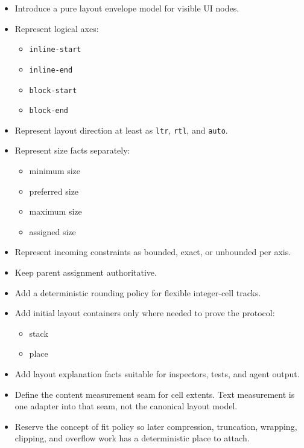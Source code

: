 \begin{itemize}
\tightlist
\item
  Introduce a pure layout envelope model for visible UI nodes.
\item
  Represent logical axes:

  \begin{itemize}
  \tightlist
  \item
    \texttt{i\allowbreak{}n\allowbreak{}l\allowbreak{}i\allowbreak{}n\allowbreak{}e\allowbreak{}-\allowbreak{}s\allowbreak{}t\allowbreak{}a\allowbreak{}r\allowbreak{}t}
  \item
    \texttt{i\allowbreak{}n\allowbreak{}l\allowbreak{}i\allowbreak{}n\allowbreak{}e\allowbreak{}-\allowbreak{}e\allowbreak{}n\allowbreak{}d}
  \item
    \texttt{b\allowbreak{}l\allowbreak{}o\allowbreak{}c\allowbreak{}k\allowbreak{}-\allowbreak{}s\allowbreak{}t\allowbreak{}a\allowbreak{}r\allowbreak{}t}
  \item
    \texttt{b\allowbreak{}l\allowbreak{}o\allowbreak{}c\allowbreak{}k\allowbreak{}-\allowbreak{}e\allowbreak{}n\allowbreak{}d}
  \end{itemize}
\item
  Represent layout direction at least as \texttt{l\allowbreak{}t\allowbreak{}r}, \texttt{r\allowbreak{}t\allowbreak{}l}, and \texttt{a\allowbreak{}u\allowbreak{}t\allowbreak{}o}.
\item
  Represent size facts separately:

  \begin{itemize}
  \tightlist
  \item
    minimum size
  \item
    preferred size
  \item
    maximum size
  \item
    assigned size
  \end{itemize}
\item
  Represent incoming constraints as bounded, exact, or unbounded per axis.
\item
  Keep parent assignment authoritative.
\item
  Add a deterministic rounding policy for flexible integer-cell tracks.
\item
  Add initial layout containers only where needed to prove the protocol:

  \begin{itemize}
  \tightlist
  \item
    stack
  \item
    place
  \end{itemize}
\item
  Add layout explanation facts suitable for inspectors, tests, and agent output.
\item
  Define the content measurement seam for cell extents. Text measurement is one adapter into that seam, not the canonical layout model.
\item
  Reserve the concept of fit policy so later compression, truncation, wrapping, clipping, and overflow work has a deterministic place to attach.
\end{itemize}

